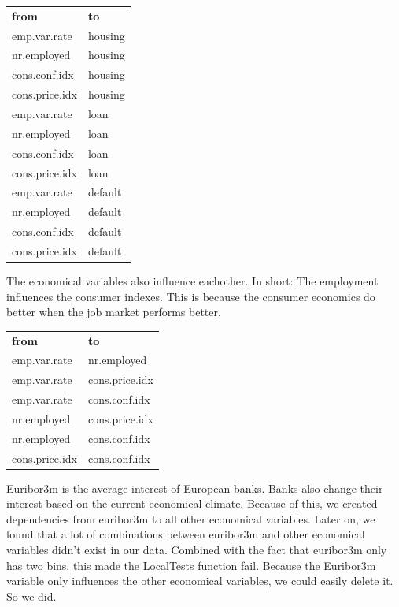 \documentclass[11pt]{article}
\begin{document}
\begin{multicols}{2}
\medskip
\begin{tabular}{ll}
    \textbf{from} & \textbf{to} \\
    emp.var.rate & housing \\
    nr.employed & housing \\ 
    cons.conf.idx & housing \\ 
    cons.price.idx & housing \\ 
    \medskip
    emp.var.rate & loan \\
    nr.employed & loan \\ 
    cons.conf.idx & loan \\ 
    cons.price.idx & loan \\
    \medskip
    emp.var.rate & default \\
    nr.employed & default \\ 
    cons.conf.idx & default \\ 
    cons.price.idx & default \\ 
\end{tabular}

\bigskip
The economical variables also influence eachother. In short: The employment
influences the consumer indexes. This is because the consumer economics do
better when the job market performs better. 

\medskip
\begin{tabular}{ll}
    \textbf{from} & \textbf{to} \\
    emp.var.rate & nr.employed \\
    emp.var.rate & cons.price.idx \\
    emp.var.rate & cons.conf.idx \\
    nr.employed & cons.price.idx \\ 
    nr.employed & cons.conf.idx \\ 
    cons.price.idx & cons.conf.idx \\ 
\end{tabular}


\bigskip
Euribor3m is the average interest of European banks. Banks also change their
interest based on the current economical climate. Because of this, we created
dependencies from euribor3m to all other economical variables. Later on, we
found that a lot of combinations between euribor3m and other economical
variables didn't exist in our data. Combined with the fact that euribor3m only
has two bins, this made the LocalTests function fail. Because the Euribor3m
variable only influences the other economical variables, we could easily delete
it. So we did. 




\end{multicols}
\end{document}
